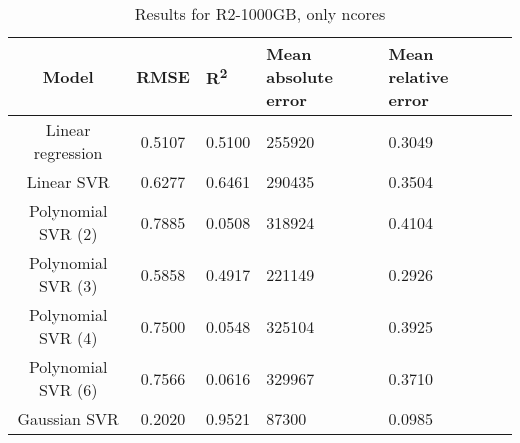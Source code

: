 \begin{table}[H]
\centering
\begin{adjustbox}{center}
\begin{tabular}{c | c M{1.2cm} M{2.5cm} M{2.5cm} M{1.8cm}}
Model & RMSE & R\textsuperscript{2} & Mean absolute error & Mean relative error \tabularnewline
\hline
Linear regression & 0.5107 & 0.5100 & 255920 & 0.3049 \\
Linear SVR & 0.6277 & 0.6461 & 290435 & 0.3504 \\
Polynomial SVR (2) & 0.7885 & 0.0508 & 318924 & 0.4104 \\
Polynomial SVR (3) & 0.5858 & 0.4917 & 221149 & 0.2926 \\
Polynomial SVR (4) & 0.7500 & 0.0548 & 325104 & 0.3925 \\
Polynomial SVR (6) & 0.7566 & 0.0616 & 329967 & 0.3710 \\
Gaussian SVR & 0.2020 & 0.9521 &  87300 & 0.0985 \\
\end{tabular}
\end{adjustbox}
\\
\caption{Results for R2-1000GB, only ncores}
\label{tab:only_1_linear_R2_1000}
\end{table}
